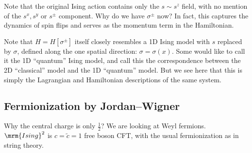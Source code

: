 \documentclass[a4paper
	,10pt
]{article}
\begin{document}
	Note that the original Ising action contains only the $s \sim s^z$ field, with no mention of the $s^x,s^y$ or $s^\pm$ component. Why do we have $\sigma^\pm$ now? In fact, this captures the dynamics of spin flips and serves as the momentum term in the Hamiltonian. 
	
	Note that $H = H[\sigma^\pm]$ itself closely resembles a 1D Ising model with $s$ replaced by $\sigma$, defined along the one spatial direction: $\sigma = \sigma(x)$. 
	Some would like to call it the 1D ``quantum'' Ising model, and call this the correspondence between the 2D ``classical'' model and the 1D ``quantum'' model. But we see here that this is simply the Lagrangian and Hamiltonian descriptions of the same system. 
	
\subsection{Fermionization by Jordan--Wigner}
	
	Why the central charge is only $\frac{1}{2}$? We are looking at Weyl fermions. $\mrm{Ising}^2$ is $c = \tilde{c} = 1$ free boson CFT, with the usual fermionization as in string theory. 
	
	
	
	
	
	
\vspace{1.2\baselineskip}
\pagebreak[4]
\raggedright
\printbibliography[%
	,heading = bibintoc
]
\end{document}

